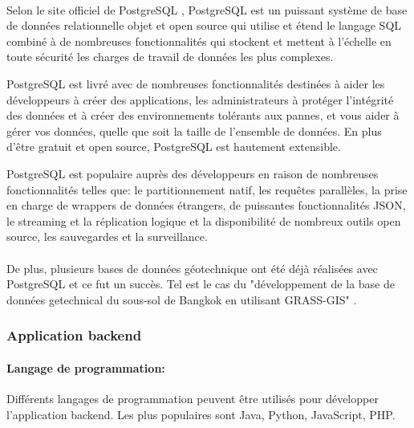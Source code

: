          \paragraph{}
         Selon le site officiel de PostgreSQL \cite{psql},
         PostgreSQL est un puissant système de base de données relationnelle objet et open 
         source qui utilise et étend le langage SQL combiné à de nombreuses fonctionnalités
          qui stockent et mettent à l'échelle en toute sécurité les charges de travail de 
          données les plus complexes.
          \par 
          PostgreSQL est livré avec de nombreuses fonctionnalités destinées à aider les 
          développeurs à créer des applications, les administrateurs à protéger 
          l'intégrité des données et à créer des environnements tolérants aux pannes, 
          et vous aider à gérer vos données, quelle que soit la taille de l'ensemble de 
          données. En plus d'être gratuit et open source, PostgreSQL est hautement extensible.
          \par 
          PostgreSQL est populaire auprès des développeurs en raison de nombreuses fonctionnalités
           telles que: le partitionnement natif, les requêtes parallèles, la prise en charge 
           de wrappers de données étrangers, de puissantes fonctionnalités JSON, le streaming et 
           la réplication logique et la disponibilité de nombreux outils open source,
            les sauvegardes et la surveillance.
            \paragraph{}
            De plus, plusieurs bases de données géotechnique ont été 
            déjà réalisées avec PostgreSQL et ce fut un succès. Tel est le cas du
            "développement de la base de données getechnical du sous-sol de Bangkok 
            en utilisant GRASS-GIS" \cite{panoot2001development}.
        \subsubsection{Application backend}
        \paragraph{Langage de programmation: }
        Différents langages de programmation peuvent être utilisés pour développer l'application 
        backend. Les plus populaires sont Java, Python, JavaScript, PHP.
